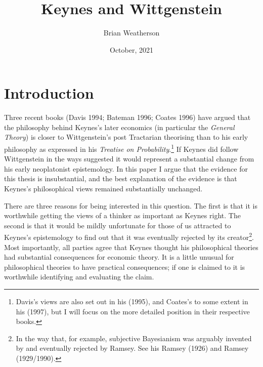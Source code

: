 \documentclass[noflushend]{philosophersimprint}
\begin{document}
\title{Keynes and Wittgenstein}

\author{Brian Weatherson}





\date{October, 2021}

\maketitle  

\hypertarget{introduction}{%
\section{Introduction}\label{introduction}}

Three recent books (Davis 1994; Bateman 1996; Coates 1996) have argued
that the philosophy behind Keynes's later economics (in particular the
\emph{General Theory}) is closer to Wittgenstein's post Tractarian
theorising than to his early philosophy as expressed in his
\emph{Treatise on Probability}.\footnote{Davis's views are also set out
  in his (1995), and Coates's to some extent in his (1997), but I will
  focus on the more detailed position in their respective books.} If
Keynes did follow Wittgenstein in the ways suggested it would represent
a substantial change from his early neoplatonist epistemology. In this
paper I argue that the evidence for this thesis is insubstantial, and
the best explanation of the evidence is that Keynes's philosophical
views remained substantially unchanged.

There are three reasons for being interested in this question. The first
is that it is worthwhile getting the views of a thinker as important as
Keynes right. The second is that it would be mildly unfortunate for
those of us attracted to Keynes's epistemology to find out that it was
eventually rejected by its creator\footnote{In the way that, for
  example, subjective Bayesianism was arguably invented by and
  eventually rejected by Ramsey. See his Ramsey (1926) and Ramsey
  (1929/1990).}. Most importantly, all parties agree that Keynes thought
his philosophical theories had substantial consequences for economic
theory. It is a little unusual for philosophical theories to have
practical consequences; if one is claimed to it is worthwhile
identifying and evaluating the claim.
\end{document}
